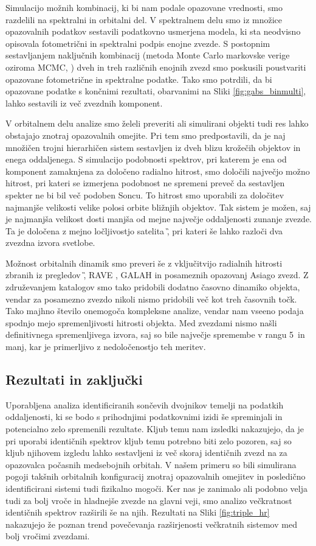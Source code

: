 Simulacijo možnih kombinacij, ki bi nam podale opazovane vrednosti, smo razdelili na spektralni in orbitalni del. V spektralnem delu smo iz množice opazovalnih podatkov sestavili podatkovno usmerjena modela, ki sta neodvisno opisovala fotometrični in spektralni podpis enojne zvezde. S postopnim sestavljanjem naključnih kombinacij (metoda Monte Carlo markovske verige oziroma MCMC, \cite{2013PASP..125..306F}) dveh in treh različnih enojnih zvezd smo poskusili poustvariti opazovane fotometrične in spektralne podatke. Tako smo potrdili, da bi opazovane podatke s končnimi rezultati, obarvanimi na Sliki \ref{fig:gabs_binmulti}, lahko sestavili iz več zvezdnih komponent.

V orbitalnem delu analize smo želeli preveriti ali simulirani objekti tudi res lahko obstajajo znotraj opazovalnih omejite. Pri tem smo predpostavili, da je naj množičen trojni hierarhičen sistem sestavljen iz dveh blizu krožečih objektov in enega oddaljenega. S simulacijo podobnosti spektrov, pri katerem je ena od komponent zamaknjena za določeno radialno hitrost, smo določili največjo možno hitrost, pri kateri se izmerjena podobnost ne spremeni preveč da sestavljen spekter ne bi bil več podoben Soncu. To hitrost smo uporabili za določitev najmanjše velikosti velike polosi orbite bližnjih objektov. Tak sistem je možen, saj je najmanjša velikost dosti manjša od mejne največje oddaljenosti zunanje zvezde. Ta je določena z mejno ločljivostjo satelita \G, pri kateri še lahko razloči dva zvezdna izvora svetlobe.

Možnost orbitalnih dinamik smo preveri še z vključitvijo radialnih hitrosti zbranih iz pregledov \G, RAVE \cite{2017AJ....153...75K}, GALAH in posameznih opazovanj Asiago zvezd. Z združevanjem katalogov smo tako pridobili dodatno časovno dinamiko objekta, vendar za posamezno zvezdo nikoli nismo pridobili več kot treh časovnih točk. Tako majhno število onemogoča kompleksne analize, vendar nam vseeno podaja spodnjo mejo spremenljivosti hitrosti objekta. Med zvezdami nismo našli definitivnega spremenljivega izvora, saj so bile največje spremembe v rangu 5~\kms in manj, kar je primerljivo z nedoločenostjo teh meritev.

\subsection{Rezultati in zaključki}
Uporabljena analiza identificiranih sončevih dvojnikov temelji na podatkih oddaljenosti, ki se bodo s prihodnjimi podatkovnimi izidi še spreminjali in potencialno zelo spremenili rezultate. Kljub temu nam izsledki nakazujejo, da je pri uporabi identičnih spektrov kljub temu potrebno biti zelo pozoren, saj so kljub njihovem izgledu lahko sestavljeni iz več skoraj identičnih zvezd na za opazovalca počasnih medsebojnih orbitah. V našem primeru so bili simulirana pogoji takšnih orbitalnih konfiguracij znotraj opazovalnih omejitev in posledično identificirani sistemi tudi fizikalno mogoči. Ker nas je zanimalo ali podobno velja tudi za bolj vroče in hladnejše zvezde na glavni veji, smo analizo večkratnost identičnih spektrov razširili še na njih. Rezultati na Sliki \ref{fig:triple_hr} nakazujejo že poznan trend \cite{2013ARA&A..51..269D} povečevanja razširjenosti večkratnih sistemov med bolj vročimi zvezdami.

